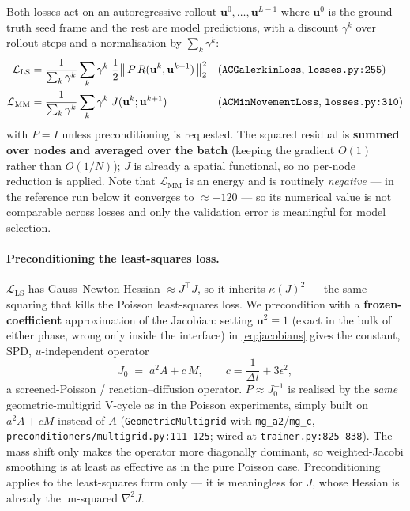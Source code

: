 \documentclass[11pt]{article}
\newcommand{\dt}{\Delta t}
\begin{document}
Both losses act on an autoregressive rollout $\mathbf u^0,\dots,\mathbf u^{L-1}$ where
$\mathbf u^0$ is the ground-truth seed frame and the rest are model predictions, with a discount
$\gamma^k$ over rollout steps and a normalisation by $\sum_k\gamma^k$:
\begin{align}
   \mathcal L_{\mathrm{LS}}
     &= \frac{1}{\sum_k \gamma^k}\sum_{k} \gamma^k\;
        \frac12\big\|\,P\,R(\mathbf u^{k},\mathbf u^{k+1})\,\big\|_2^2
        &&\text{(\texttt{ACGalerkinLoss}, \texttt{losses.py:255})} \label{eq:loss-ls}\\
   \mathcal L_{\mathrm{MM}}
     &= \frac{1}{\sum_k \gamma^k}\sum_{k} \gamma^k\;
        J(\mathbf u^{k};\mathbf u^{k+1})
        &&\text{(\texttt{ACMinMovementLoss}, \texttt{losses.py:310})} \label{eq:loss-mm}
\end{align}
with $P=I$ unless preconditioning is requested. The squared residual is \textbf{summed over nodes
and averaged over the batch} (keeping the gradient $O(1)$ rather than $O(1/N)$); $J$ is already a
spatial functional, so no per-node reduction is applied. Note that $\mathcal L_{\mathrm{MM}}$ is an
energy and is routinely \emph{negative} --- in the reference run below it converges to
$\approx-120$ --- so its numerical value is not comparable across losses and only the validation
error is meaningful for model selection.

\paragraph{Preconditioning the least-squares loss.}
$\mathcal L_{\mathrm{LS}}$ has Gauss--Newton Hessian $\approx J^\top J$, so it inherits
$\kappa(J)^2$ --- the same squaring that kills the Poisson least-squares loss. We precondition with
a \textbf{frozen-coefficient} approximation of the Jacobian: setting $\mathbf u^2\equiv 1$ (exact in
the bulk of either phase, wrong only inside the interface) in \eqref{eq:jacobians} gives the
constant, SPD, $u$-independent operator
\begin{equation}\label{eq:frozen}
   J_0 \;=\; a^2 A + c\,M, \qquad c = \frac{1}{\dt} + 3\epsilon^2 ,
\end{equation}
a screened-Poisson / reaction--diffusion operator. $P\approx J_0^{-1}$ is realised by the
\emph{same} geometric-multigrid V-cycle as in the Poisson experiments, simply built on
$a^2A+cM$ instead of $A$ (\texttt{GeometricMultigrid} with \texttt{mg\_a2}/\texttt{mg\_c},
\texttt{preconditioners/multigrid.py:111--125}; wired at \texttt{trainer.py:825--838}). The mass
shift only makes the operator more diagonally dominant, so weighted-Jacobi smoothing is at least as
effective as in the pure Poisson case. Preconditioning applies to the least-squares form only ---
it is meaningless for $J$, whose Hessian is already the un-squared $\nabla^2 J$.
\end{document}
